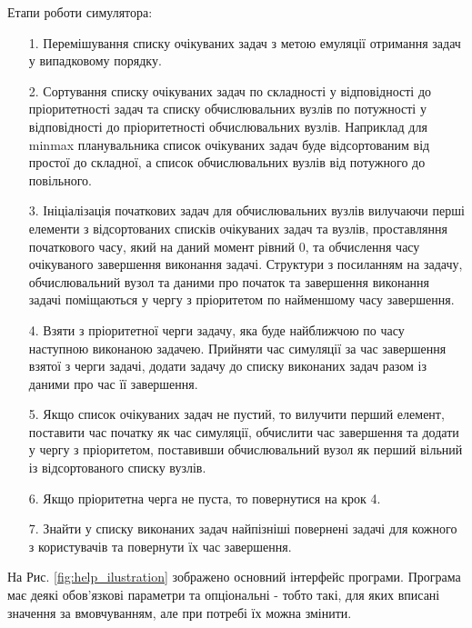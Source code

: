 Етапи роботи симулятора:
\begin{itemize}
	\item[1.] Перемішування списку очікуваних задач з метою емуляції отримання задач у випадковому порядку.
	
	\item[2.] Сортування списку очікуваних задач по складності у відповідності до пріоритетності задач та списку обчислювальних вузлів по потужності у відповідності до пріоритетності обчислювальних вузлів. Наприклад для minmax планувальника список очікуваних задач буде відсортованим від простої до складної, а список обчислювальних вузлів від потужного до повільного.
	
	\item[3.] Ініціалізація початкових задач для обчислювальних вузлів вилучаючи перші елементи з  відсортованих списків очікуваних задач та вузлів, проставляння початкового часу, який на даний момент рівний 0, та обчислення часу очікуваного завершення виконання задачі. Структури з посиланням на задачу, обчислювальний вузол та даними про початок та завершення виконання задачі поміщаються у чергу з пріоритетом по найменшому часу завершення.
	
	\item[4.] Взяти з пріоритетної черги задачу, яка буде найближчою по часу наступною виконаною задачею. Прийняти час симуляції за час завершення взятої з черги задачі, додати задачу до списку виконаних задач разом із даними про час її завершення.
	
	\item[5.] Якщо список очікуваних задач не пустий, то вилучити перший елемент, поставити час початку як час симуляції, обчислити час завершення та додати у чергу з пріоритетом, поставивши обчислювальний вузол як перший вільний із відсортованого списку вузлів.
	
	\item[6.] Якщо пріоритетна черга не пуста, то повернутися на крок 4.
	
	\item[7.] Знайти у списку виконаних задач найпізніші повернені задачі для кожного з користувачів та повернути їх час завершення.
\end{itemize}

На Рис. \ref{fig:help_ilustration} зображено основний інтерфейс програми. Програма має деякі обов'язкові параметри та опціональні - тобто такі, для яких вписані значення за вмовчуванням, але при потребі їх можна змінити.

